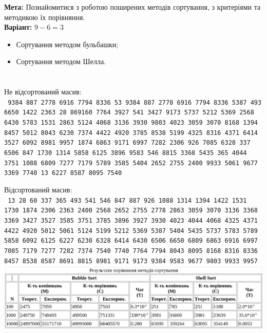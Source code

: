 \documentclass{article}
\begin{document}
	
	
	
\Large	
\textbf{Мета:} Познайомитися з роботою поширених методів сортування, з критеріями та методикою їх порівняння. \\

	\textbf{Варіант:} $9 - 6= 3$
	\begin{itemize}
	\item  Сортування методом бульбашки;
	\item Сортування методом Шелла.
	\end{itemize}
\section*{}

\large Не відсортований масив:\\
\texttt{
9384 887 2778 6916 7794 8336 53 9384 887 2778 6916 7794 8336 5387 493 6650 1422 2363 28 869160 7764 3927 541 3427 9173 5737 5212 5369 2568 6430 5783 1531 2863 5124 4068 3136 3930 9803 4023 3059 3070 8168 1394 8457 5012 8043 6230 7374 4422 4920 3785 8538 5199 4325 8316 4371 6414 3527 6092 8981 9957 1874 6863 9171 6997 7282 2306 926 7085 6328 337 6506 847 1730 1314 5858 6125 3896 9583 546 8815 3368 5435 365 4044 3751 1088 6809 7277 7179 5789 3585 5404 2652 2755 2400 9933 5061 9677 3369 7740 13 6227 8587 8095 7540 
}


\large Відсортований масив:\\ 
\texttt{
13 28 60 337 365 493 541 546 847 887 926 1088 1314 1394 1422 1531 1730 1874 2306 2363 2400 2568 2652 2755 2778 2863 3059 3070 3136 3368 3369 3427 3527 3585 3751 3785 3896 3927 3930 4023 4044 4068 4325 4371 4422 4920 5012 5061 5124 5199 5212 5369 5387 5404 5435 5737 5783 5789 5858 6092 6125 6227 6230 6328 6414 6430 6506 6650 6809 6863 6916 6997 7085 7179 7277 7282 7374 7540 7740 7764 7794 8043 8095 8168 8316 8336 8457 8538 8587 8691 8815 8981 9171 9173 9384 9583 9677 9803 9933 9957 
}\\

\hspace{-2cm}\includegraphics[width=18.5cm]{results.png}

\newpage
\end{document}
